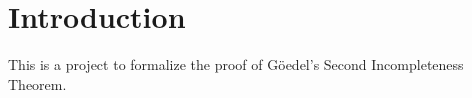 \chapter{Introduction}

This is a project to formalize the proof of G\"oedel's Second Incompleteness Theorem.
